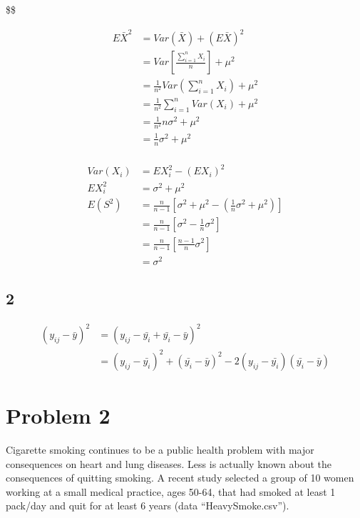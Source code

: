 \documentclass[]{article}
\begin{document}
\$\$

\[
\begin{aligned}
E\bar{X}^{2} &= Var(\bar{X}) + (E\bar{X})^{2} \\
&= Var\left [ \frac{\sum_{i=1}^{n}X_{i}}{n} \right ]+\mu^{2}\\
&=\frac{1}{n^{2}}Var\left ( \sum_{i=1}^{n}X_{i} \right )+\mu^{2}\\
&=\frac{1}{n^{2}}\sum_{i=1}^{n}Var(X_{i})+\mu^{2}\\
&=\frac{1}{n^{2}}n\sigma^{2}+\mu^{2}\\
&=\frac{1}{n}\sigma^{2}+\mu^{2}\\
\end{aligned}
\]

\[
\begin{aligned}
Var(X_{i})&=EX_{i}^{2}-(EX_{i})^{2}\\
EX_{i}^{2}&=\sigma^{2}+\mu^{2}\\
E(S^{2})&=\frac{n}{n-1}\left[\sigma^{2}+\mu^{2}-(\frac{1}{n}\sigma^{2}+\mu^{2})\right]\\
&=\frac{n}{n-1}\left[\sigma^{2}-\frac{1}{n}\sigma^{2}\right]\\
&=\frac{n}{n-1}\left[\frac{n-1}{n}\sigma^{2}\right]\\
&=\sigma^{2}
\end{aligned}
\]

\subsection{2}\label{section-1}

\[
\begin{aligned}
(y_{ij}-\bar{y})^{2}&=(y_{ij}-\bar{y_{i}}+\bar{y_{i}}-\bar{y})^{2}\\
&=(y_{ij}-\bar{y_{i}})^{2}+(\bar{y_{i}}-\bar{y})^{2}-2(y_{ij}-\bar{y_{i}})(\bar{y_{i}}-\bar{y})
\end{aligned}
\]

\section{Problem 2}\label{problem-2}

Cigarette smoking continues to be a public health problem with major
consequences on heart and lung diseases. Less is actually known about
the consequences of quitting smoking. A recent study selected a group of
10 women working at a small medical practice, ages 50-64, that had
smoked at least 1 pack/day and quit for at least 6 years (data
``HeavySmoke.csv'').
\end{document}
